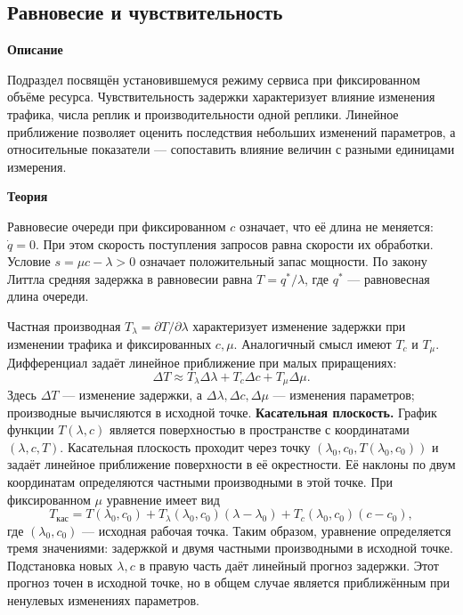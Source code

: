 \documentclass[12pt,a4paper]{article}
\newcommand{\taskhead}[1]{\par\textbf{#1}\par}
\begin{document}
\subsection{Равновесие и чувствительность}
\taskhead{Описание}
Подраздел посвящён установившемуся режиму сервиса при фиксированном объёме
ресурса. Чувствительность задержки характеризует влияние изменения трафика,
числа реплик и производительности одной реплики. Линейное приближение
позволяет оценить последствия небольших изменений параметров, а относительные
показатели --- сопоставить влияние величин с разными единицами измерения.
\taskhead{Теория}
Равновесие очереди при фиксированном $c$ означает, что её длина не меняется:
$\dot q=0$. При этом скорость поступления запросов равна скорости их обработки.
Условие $s=\mu c-\lambda>0$ означает положительный запас мощности.
По закону Литтла средняя задержка в равновесии равна $T=q^*/\lambda$,
где $q^*$ --- равновесная длина очереди.

Частная производная $T_\lambda=\partial T/\partial\lambda$ характеризует
изменение задержки при изменении трафика и фиксированных $c,\mu$.
Аналогичный смысл имеют $T_c$ и $T_\mu$.
Дифференциал задаёт линейное приближение при малых приращениях:
\[
\Delta T\approx T_\lambda\Delta\lambda+T_c\Delta c+T_\mu\Delta\mu.
\]
Здесь $\Delta T$ --- изменение задержки, а $\Delta\lambda,\Delta c,\Delta\mu$
--- изменения параметров; производные вычисляются в исходной точке.
\textbf{Касательная плоскость.}
График функции $T(\lambda,c)$ является поверхностью в пространстве
с координатами $(\lambda,c,T)$. Касательная плоскость проходит через точку
$(\lambda_0,c_0,T(\lambda_0,c_0))$ и задаёт линейное приближение поверхности
в её окрестности. Её наклоны по двум координатам определяются частными
производными в этой точке. При фиксированном $\mu$ уравнение имеет вид
\[
T_{\mathrm{кас}}=T(\lambda_0,c_0)
+T_\lambda(\lambda_0,c_0)(\lambda-\lambda_0)
+T_c(\lambda_0,c_0)(c-c_0),
\]
где $(\lambda_0,c_0)$ --- исходная рабочая точка.
Таким образом, уравнение определяется тремя значениями: задержкой
и двумя частными производными в исходной точке. Подстановка новых
$\lambda,c$ в правую часть даёт линейный прогноз задержки.
Этот прогноз точен в исходной точке, но в общем случае является
приближённым при ненулевых изменениях параметров.
\end{document}
